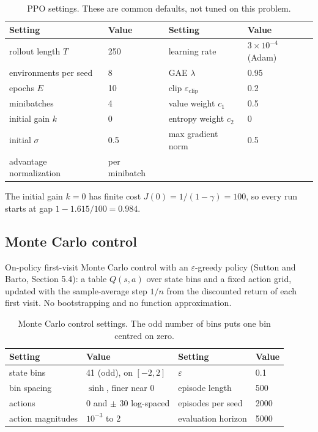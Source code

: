 \documentclass[11pt]{article}
\begin{document}
\begin{table}[H]
  \centering
  \begin{tabular}{@{}llll@{}}
    \toprule
    Setting & Value & Setting & Value \\
    \midrule
    rollout length $T$ & 250 & learning rate & $3 \times 10^{-4}$ (Adam) \\
    environments per seed & 8 & GAE $\lambda$ & 0.95 \\
    epochs $E$ & 10 & clip $\varepsilon_{\mathrm{clip}}$ & 0.2 \\
    minibatches & 4 & value weight $c_1$ & 0.5 \\
    initial gain $k$ & 0 & entropy weight $c_2$ & 0 \\
    initial $\sigma$ & 0.5 & max gradient norm & 0.5 \\
    advantage normalization & per minibatch & & \\
    \bottomrule
  \end{tabular}
  \caption{PPO settings. These are common defaults, not tuned on this problem.}
\end{table}

The initial gain $k = 0$ has finite cost $J(0) = 1/(1-\gamma) = 100$, so every run starts at gap
$1 - 1.615/100 = 0.984$.

\subsection{Monte Carlo control}

On-policy first-visit Monte Carlo control with an $\varepsilon$-greedy policy (Sutton and Barto,
Section 5.4): a table $Q(s, a)$ over state bins and a fixed action grid, updated with the
sample-average step $1/n$ from the discounted return of each first visit. No bootstrapping and no
function approximation.

\begin{table}[H]
  \centering
  \begin{tabular}{@{}llll@{}}
    \toprule
    Setting & Value & Setting & Value \\
    \midrule
    state bins & 41 (odd), on $[-2, 2]$ & $\varepsilon$ & 0.1 \\
    bin spacing & $\sinh$, finer near 0 & episode length & 500 \\
    actions & 0 and $\pm$ 30 log-spaced & episodes per seed & 2000 \\
    action magnitudes & $10^{-3}$ to 2 & evaluation horizon & 5000 \\
    \bottomrule
  \end{tabular}
  \caption{Monte Carlo control settings. The odd number of bins puts one bin centred on zero.}
\end{table}
\end{document}
